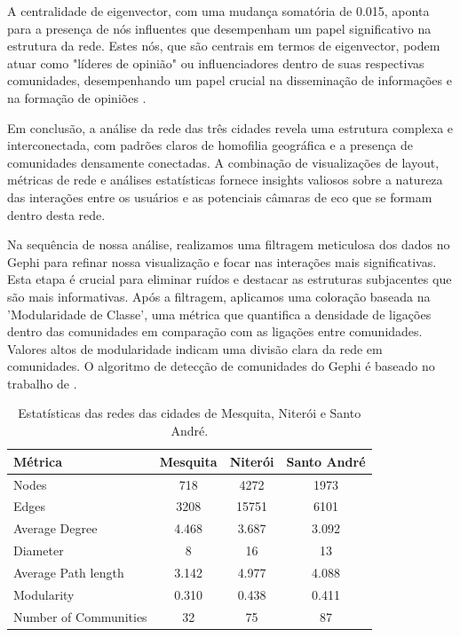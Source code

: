 A centralidade de eigenvector, com uma mudança somatória de 0.015, aponta para a presença de nós influentes que desempenham um papel significativo na estrutura da rede. Estes nós, que são centrais em termos de eigenvector, podem atuar como "líderes de opinião" ou influenciadores dentro de suas respectivas comunidades, desempenhando um papel crucial na disseminação de informações e na formação de opiniões \cite{1987_Bonacich}.

Em conclusão, a análise da rede das três cidades revela uma estrutura complexa e interconectada, com padrões claros de homofilia geográfica e a presença de comunidades densamente conectadas. A combinação de visualizações de layout, métricas de rede e análises estatísticas fornece insights valiosos sobre a natureza das interações entre os usuários e as potenciais câmaras de eco que se formam dentro desta rede.

Na sequência de nossa análise, realizamos uma filtragem meticulosa dos dados no Gephi para refinar nossa visualização e focar nas interações mais significativas. Esta etapa é crucial para eliminar ruídos e destacar as estruturas subjacentes que são mais informativas. Após a filtragem, aplicamos uma coloração baseada na 'Modularidade de Classe', uma métrica que quantifica a densidade de ligações dentro das comunidades em comparação com as ligações entre comunidades. Valores altos de modularidade indicam uma divisão clara da rede em comunidades. O algoritmo de detecção de comunidades do Gephi é baseado no trabalho de .

\begin{table}[h]
	\centering
	\begin{tabular}{lccc}
		\hline
		\textbf{Métrica}      & \textbf{Mesquita} & \textbf{Niterói} & \textbf{Santo André} \\
		\hline
		Nodes                 & 718               & 4272             & 1973                 \\
		Edges                 & 3208              & 15751            & 6101                 \\
		Average Degree        & 4.468             & 3.687            & 3.092                \\
		Diameter              & 8                 & 16               & 13                   \\
		Average Path length   & 3.142             & 4.977            & 4.088                \\
		Modularity            & 0.310             & 0.438            & 0.411                \\
		Number of Communities & 32                & 75               & 87                   \\
		\hline
	\end{tabular}
	\caption{Estatísticas das redes das cidades de Mesquita, Niterói e Santo André.}
\end{table}

